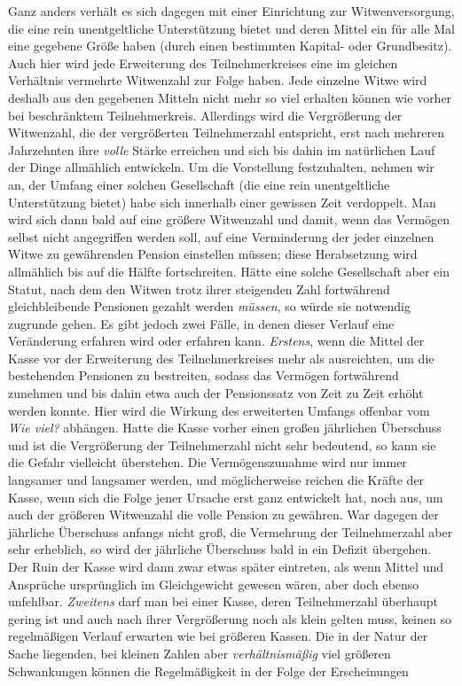 Ganz anders verhält es sich dagegen mit einer Einrichtung zur Witwenversorgung, die eine rein unentgeltliche Unterstützung bietet und deren Mittel ein für alle Mal eine gegebene Größe haben (durch einen bestimmten Kapital- oder Grundbesitz). Auch hier wird jede Erweiterung des Teilnehmerkreises eine im gleichen Verhältnis vermehrte Witwenzahl zur Folge haben. Jede einzelne Witwe wird deshalb aus den gegebenen Mitteln nicht mehr so viel erhalten können wie vorher bei beschränktem Teilnehmerkreis. Allerdings wird die Vergrößerung der Witwenzahl, die der vergrößerten Teilnehmerzahl entspricht, erst nach mehreren Jahrzehnten ihre \textit{volle} Stärke erreichen und sich bis dahin im natürlichen Lauf der Dinge allmählich entwickeln. Um die Vorstellung festzuhalten, nehmen wir an, der Umfang einer solchen Gesellschaft (die eine rein unentgeltliche Unterstützung bietet) habe sich innerhalb einer gewissen Zeit verdoppelt. Man wird sich dann bald auf eine größere Witwenzahl und damit, wenn das Vermögen selbst nicht angegriffen werden soll, auf eine Verminderung der jeder einzelnen Witwe zu gewährenden Pension einstellen müssen; diese Herabsetzung wird allmählich bis auf die Hälfte fortschreiten. Hätte eine solche Gesellschaft aber ein Statut, nach dem den Witwen trotz ihrer steigenden Zahl fortwährend gleichbleibende Pensionen gezahlt werden \textit{müssen}, so würde sie notwendig zugrunde gehen. Es gibt jedoch zwei Fälle, in denen dieser Verlauf eine Veränderung erfahren wird oder erfahren kann. \textit{Erstens}, wenn die Mittel der Kasse vor der Erweiterung des Teilnehmerkreises mehr als ausreichten, um die bestehenden Pensionen zu bestreiten, sodass das Vermögen fortwährend zunehmen und bis dahin etwa auch der Pensionssatz von Zeit zu Zeit erhöht werden konnte. Hier wird die Wirkung des erweiterten Umfangs offenbar vom \textit{Wie viel?} abhängen. Hatte die Kasse vorher einen großen jährlichen Überschuss und ist die Vergrößerung der Teilnehmerzahl nicht sehr bedeutend, so kann sie die Gefahr vielleicht überstehen. Die Vermögenszunahme wird nur immer langsamer und langsamer werden, und möglicherweise reichen die Kräfte der Kasse, wenn sich die Folge jener Ursache erst ganz entwickelt hat, noch aus, um auch der größeren Witwenzahl die volle Pension zu gewähren. War dagegen der jährliche Überschuss anfangs nicht groß, die Vermehrung der Teilnehmerzahl aber sehr erheblich, so wird der jährliche Überschuss bald in ein Defizit übergehen. Der Ruin der Kasse wird dann zwar etwas später eintreten, als wenn Mittel und Ansprüche ursprünglich im Gleichgewicht gewesen wären, aber doch ebenso unfehlbar. \textit{Zweitens} darf man bei einer Kasse, deren Teilnehmerzahl überhaupt gering ist und auch nach ihrer Vergrößerung noch als klein gelten muss, keinen so regelmäßigen Verlauf erwarten wie bei größeren Kassen. Die in der Natur der Sache liegenden, bei kleinen Zahlen aber \textit{verhältnismäßig} viel größeren Schwankungen können die Regelmäßigkeit in der Folge der Erscheinungen
